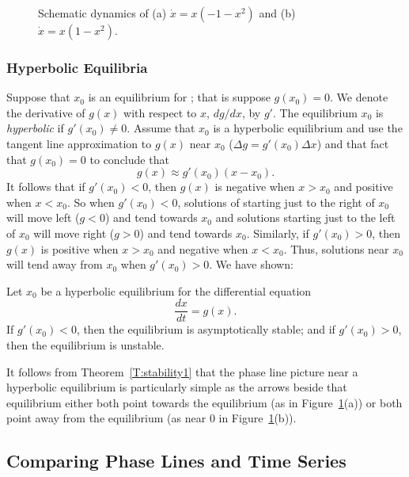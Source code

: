 \documentclass{ximera}
\begin{document}
\begin{figure}[htb]
       \centerline{%
	}
\caption{Schematic dynamics of (a) $\dot{x}=x(-1-x^2)$ and (b) $\dot{x}=x(1-x^2)$.}
\label{pitch3}
\end{figure}

\subsubsection*{Hyperbolic Equilibria}

Suppose that $x_0$ is an equilibrium for ; that is suppose
$g(x_0)=0$.  We denote the derivative of $g(x)$ with respect to $x$, 
$dg/dx$, by $g'$.  The equilibrium $x_0$ is 
{\em hyperbolic\/} 
if $g'(x_0)\neq 0$.  Assume that $x_0$ is a hyperbolic equilibrium and use
the tangent line approximation to $g(x)$ near $x_0$
($\Delta g = g'(x_0)\Delta x$) and that fact that $g(x_0)=0$ to conclude that
\[
g(x) \approx g'(x_0)(x-x_0).
\]
It follows that if $g'(x_0)<0$, then $g(x)$ is negative when
$x>x_0$ and positive when $x<x_0$.  So when $g'(x_0)<0$,
solutions of  starting just to the right of $x_0$ will
move left ($g<0$) and tend towards $x_0$ and solutions starting
just to the left of $x_0$ will move right ($g>0$) and tend
towards $x_0$.  Similarly, if $g'(x_0)>0$, then $g(x)$ is positive
when $x>x_0$ and negative when $x<x_0$.  Thus, solutions near $x_0$ 
will tend away from $x_0$ when $g'(x_0)>0$.    We  have shown:
\begin{thm} \label{T:stability1}
Let $x_0$ be a hyperbolic equilibrium for the differential equation
\[
\frac{dx}{dt} = g(x).
\]
If $g'(x_0)<0$, then the equilibrium is asymptotically stable;
and if $g'(x_0)>0$, then the equilibrium is unstable.
\end{thm}  

It follows from Theorem~\ref{T:stability1} that the phase line picture
near a hyperbolic equilibrium is particularly simple as the arrows beside
that equilibrium either both point towards the equilibrium (as in
Figure~\ref{pitch3}(a)) or both point away from the equilibrium (as near $0$
in Figure~\ref{pitch3}(b)).

\subsection*{Comparing Phase Lines and Time Series}
\end{document}
